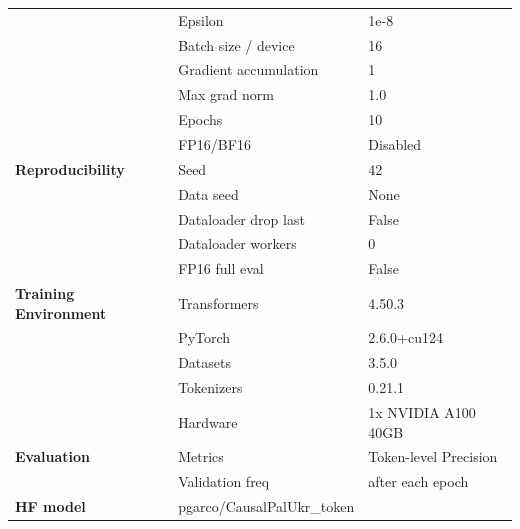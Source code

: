 \documentclass[11pt]{article}
\begin{document}
\begin{table}[htbp]
{\begin{tabular}{lll}
 & Epsilon & 1e-8 \\
 & Batch size / device & 16 \\
 & Gradient accumulation & 1 \\
 & Max grad norm & 1.0 \\
 & Epochs & 10 \\
 & FP16/BF16 & Disabled \\
\midrule
\textbf{Reproducibility} & Seed & 42 \\
 & Data seed & None \\
 & Dataloader drop last & False \\
 & Dataloader workers & 0 \\
 & FP16 full eval & False \\
\midrule 
\textbf{Training Environment} & Transformers & 4.50.3 \\
 & PyTorch & 2.6.0+cu124 \\
 & Datasets & 3.5.0 \\
 & Tokenizers & 0.21.1 \\
 & Hardware & 1x NVIDIA A100 40GB\\
\midrule
\textbf{Evaluation} & Metrics & Token-level Precision\\
 & Validation freq & after each epoch \\
  \midrule
\textbf{HF model} & {pgarco/CausalPalUkr\_token}\\
\bottomrule
\end{tabular}
}
\end{table}
\end{document}
